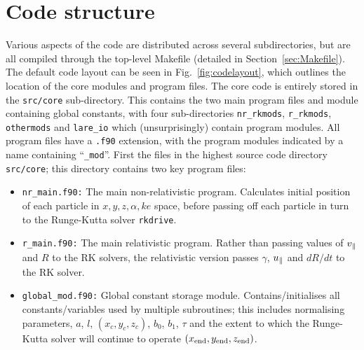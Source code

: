 \documentclass[a4paper,11pt,usenames,dvipsnames]{article}
\begin{document}
\section{Code structure}\label{sec:layout}
Various aspects of the code are distributed across several subdirectories, but are all compiled through the top-level Makefile (detailed in Section~\ref{sec:Makefile}).
The default code layout can be seen in Fig.~\ref{fig:codelayout}, which outlines the location of the core modules and program files. 
The core code is entirely stored in the \texttt{src/core} sub-directory. This contains the two main program files and module containing global constants, with four sub-directories \texttt{nr\_rkmods}, \texttt{r\_rkmods}, \texttt{othermods} and \texttt{lare\_io} which (unsurprisingly) contain program modules. All program files have a \texttt{.f90} extension, with the program modules indicated by a name containing ``\texttt{\_mod}''.
First the files in the highest source code directory \texttt{src/core}; this directory contains two key program files:
\begin{itemize}
 \item{\texttt{nr\_main.f90:}} The main non-relativistic program. Calculates initial position of each particle in $x,y,z,\alpha,ke$ space, before passing off each particle in turn to the Runge-Kutta solver \texttt{rkdrive}.
\item{\texttt{r\_main.f90:}} The main relativistic program. Rather than passing values of $v_{\parallel}$ and $R$ to the RK solvers, the relativistic version passes $\gamma$, $u_{\parallel}$ and $dR/dt$ to the RK solver.
 \item{\texttt{global\_mod.f90:}} Global constant storage module. Contains/initialises all constants/variables used by multiple subroutines; this includes normalising parameters, $a$, $l$, $(x_c,y_c,z_c)$, $b_0$, $b_1$, $\tau$ and the extent to which the Runge-Kutta solver will continue to operate $(x_{\rm{end}},y_{\rm{end}},z_{\rm{end}})$. 
\end{itemize}
\end{document}

